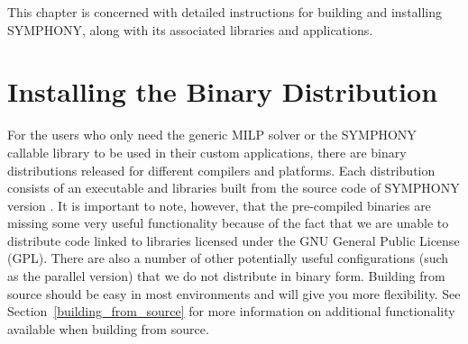 
This chapter is concerned with detailed instructions for building and
installing SYMPHONY, along with its associated libraries and applications.

\section{Installing the Binary Distribution}

For the users who only need the generic MILP solver or the SYMPHONY callable
library to be used in their custom applications, there are binary
distributions released for different compilers and platforms. Each
distribution consists of an executable and libraries built from the source
code of SYMPHONY version \VER. It is important to note, however, that the
pre-compiled binaries are missing some very useful functionality because of
the fact that we are unable to distribute code linked to libraries licensed
under the GNU General Public License (GPL). There are also a number of other
potentially useful configurations (such as the parallel version) that we do not
distribute in binary form. Building from source should be easy in most
environments and will give you more flexibility. See
Section~\ref{building_from_source} for more information on additional
functionality available when building from source.
 
